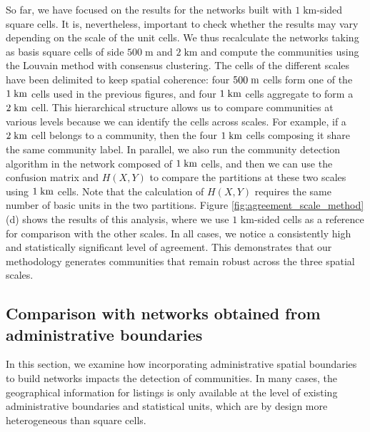So far, we have focused on the results for the networks built with $1 \; \textrm{km}$-sided square cells. It is, nevertheless, important to check whether the results may vary depending on the scale of the unit cells. We thus recalculate the networks taking as basis square cells of side $500 \; \textrm{m}$ and $2 \; \textrm{km}$ and compute the communities using the Louvain method with consensus clustering. 
The cells of the different scales have been delimited to keep spatial coherence: four $500 \;\rm{m}$ cells form one of the $1  \;\rm{km}$ cells used in the previous figures, and four $1 \; \rm{km}$ cells aggregate to form a $2 \; \rm{km}$ cell. 
This hierarchical structure allows us to compare communities at various levels because we can identify the cells across scales. For example, if a $2 \;\rm{ km}$ cell belongs to a community, then the four $1 \;\rm{ km}$ cells composing it share the same community label.
In parallel, we also run the community detection algorithm in the network composed of $1 \; \rm{ km}$ cells, and then we can use the confusion matrix and $H(X,Y)$ to compare the partitions at these two scales using $1 \;\rm{ km}$ cells. Note that the calculation of $H(X,Y)$ requires the same number of basic units in the two partitions. Figure \ref{fig:agreement_scale_method}(d) shows the results of this analysis, where we use $1$ km-sided cells as a reference for comparison with the other scales. In all cases, we notice a consistently high and statistically significant level of agreement. This demonstrates that our methodology generates communities that remain robust across the three spatial scales.

\subsection{Comparison with networks obtained from administrative boundaries}\label{sec:political spatial units}

In this section, we examine how incorporating administrative spatial boundaries to build networks impacts the detection of communities. In many cases, the geographical information for listings is only available at the level of existing administrative boundaries and statistical units, which are by design more heterogeneous than square cells.

